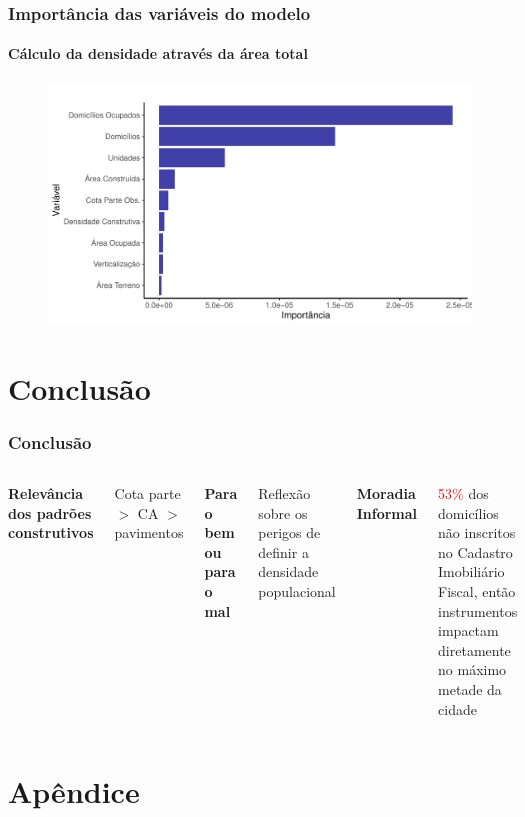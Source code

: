 \documentclass[%
    8pt, 
    aspectratio=169,
]{beamer}
\begin{document}
\begin{frame}
    \frametitle{Importância das variáveis do modelo}
    \framesubtitle{Cálculo da densidade através da área total}
    \begin{figure}
        \includegraphics[width = .8\textwidth]{imagens/var_importance_densmod.pdf}
    \end{figure}
\end{frame}


\section{Conclusão}

\begin{frame}
    \frametitle{Conclusão}
    \begin{columns}[T]
        \textbf{Relevância dos padrões construtivos}
        \bigskip

        Cota parte $>$ CA $>$ pavimentos

        \textbf{Para o bem ou para o mal}
        \bigskip

        Reflexão sobre os perigos de definir a densidade populacional

        \textbf{Moradia Informal}
        \bigskip

        \textcolor{red}{53\%} dos domicílios não inscritos no Cadastro Imobiliário Fiscal, então instrumentos impactam diretamente no máximo metade da cidade

    \end{columns}
\end{frame}

\section{Apêndice}
\end{document}
